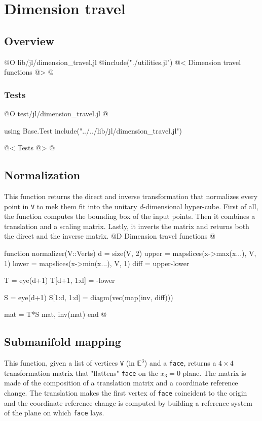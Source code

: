 
\chapter{Dimension travel}

\section{Overview}
@O lib/jl/dimension_travel.jl
@{include("./utilities.jl")
@< Dimension travel functions @>
@}
\subsection{Tests}
@O test/jl/dimension_travel.jl
@{using Base.Test
include("../../lib/jl/dimension_travel.jl")

@< Tests @>
@}


\section{Normalization}
This function returns the direct and inverse transformation that
normalizes every point in \texttt{V} to mek them fit into the unitary
$d$-dimensional hyper-cube.
First of all, the function computes the bounding box of the input points.
Then it combines a translation and a scaling matrix. Lastly, it
inverts the matrix and returns both the direct and the inverse matrix.
@D Dimension travel functions
@{function normalizer(V::Verts)
    d = size(V, 2)
    upper = mapslices(x->max(x...), V, 1)
    lower = mapslices(x->min(x...), V, 1)
    diff = upper-lower

    T = eye(d+1)
    T[d+1, 1:d] = -lower

    S = eye(d+1)
    S[1:d, 1:d] = diagm(vec(map(inv, diff)))

    mat = T*S
    mat, inv(mat)
end
@}


\section{Submanifold mapping}

This function, given a list of vertices \texttt{V} (in $\mathbb{E}^3$) and a 
\texttt{face}, returns a $4\times4$ transformation matrix that "flattens"
\texttt{face} on the $x_3=0$ plane. The matrix is made of the composition of
a translation matrix and a coordinate reference change. The translation
makes the first vertex of \texttt{face} coincident to the origin and
the coordinate reference change is computed by building a reference
system of the plane on which \texttt{face} lays.


